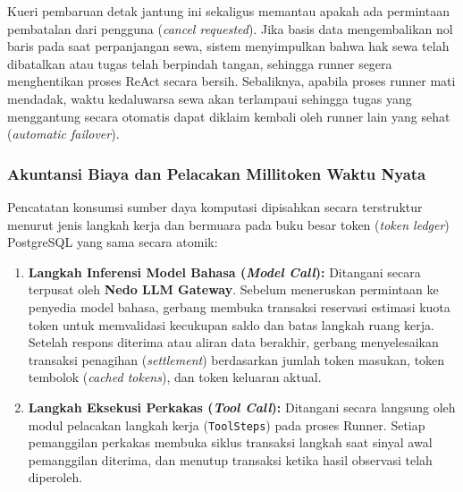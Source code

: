 Kueri pembaruan detak jantung ini sekaligus memantau apakah ada permintaan pembatalan dari pengguna (\textit{cancel requested}). Jika basis data mengembalikan nol baris pada saat perpanjangan sewa, sistem menyimpulkan bahwa hak sewa telah dibatalkan atau tugas telah berpindah tangan, sehingga runner segera menghentikan proses ReAct secara bersih. Sebaliknya, apabila proses runner mati mendadak, waktu kedaluwarsa sewa akan terlampaui sehingga tugas yang menggantung secara otomatis dapat diklaim kembali oleh runner lain yang sehat (\textit{automatic failover}).

\subsubsection{Akuntansi Biaya dan Pelacakan Millitoken Waktu Nyata}
Pencatatan konsumsi sumber daya komputasi dipisahkan secara terstruktur menurut jenis langkah kerja dan bermuara pada buku besar token (\textit{token ledger}) PostgreSQL yang sama secara atomik:
\begin{enumerate}[label=\alph*.]
  \item \textbf{Langkah Inferensi Model Bahasa (\textit{Model Call}):} Ditangani secara terpusat oleh \textbf{Nedo LLM Gateway}. Sebelum meneruskan permintaan ke penyedia model bahasa, gerbang membuka transaksi reservasi estimasi kuota token untuk memvalidasi kecukupan saldo dan batas langkah ruang kerja. Setelah respons diterima atau aliran data berakhir, gerbang menyelesaikan transaksi penagihan (\textit{settlement}) berdasarkan jumlah token masukan, token tembolok (\textit{cached tokens}), dan token keluaran aktual.
  \item \textbf{Langkah Eksekusi Perkakas (\textit{Tool Call}):} Ditangani secara langsung oleh modul pelacakan langkah kerja (\texttt{ToolSteps}) pada proses Runner. Setiap pemanggilan perkakas membuka siklus transaksi langkah saat sinyal awal pemanggilan diterima, dan menutup transaksi ketika hasil observasi telah diperoleh.
\end{enumerate}

